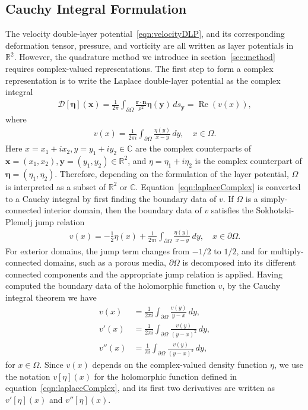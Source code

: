 \documentclass[3p]{elsarticle}
\newcommand{\Real}{\Re}
\newcommand{\bd}{{\partial}}
\newcommand{\CC}{{\mathbb{C}}}
\newcommand{\DD}{{\mathcal{D}}}
\newcommand{\eeta}{{\boldsymbol\eta}}
\newcommand{\nn}{{\mathbf{n}}}
\newcommand{\rr}{{\mathbf{r}}}
\renewcommand{\Re}{{\operatorname{Re}}}
\newcommand{\RR}{{\mathbb{R}}}
\newcommand{\xx}{{\mathbf{x}}}
\newcommand{\yy}{{\mathbf{y}}}
\begin{document}
\subsection{Cauchy Integral Formulation}
\label{sec:DLPcomplex}
The velocity double-layer potential~\eqref{eqn:velocityDLP}, and its
corresponding deformation tensor, pressure, and vorticity are all
written as layer potentials in $\RR^2$. However, the quadrature method
we introduce in section~\ref{sec:method} requires complex-valued
representations. The first step to form a complex representation is to
write the Laplace double-layer potential as the complex integral
\begin{align}
  \DD[\eeta](\xx) = \frac{1}{2\pi} \int_{\bd\Omega} 
    \frac{\rr \cdot \nn}{\rho^2}\eeta(\yy)\, ds_\yy = \Real (v(x)),
\end{align}
where
\begin{align}
  v(x) = \frac{1}{2\pi i} \int_{\bd\Omega}
    \frac{\eta(y)}{x - y} \, dy, \quad x \in \Omega.
  \label{eqn:laplaceComplex}
\end{align}
Here $x = x_1 + i x_2,y = y_1 + i y_2 \in \CC$ are the complex
counterparts of $\xx = (x_1,x_2),\yy = (y_1,y_2) \in \RR^2$, and $\eta =
\eta_1 + i \eta_2$ is the complex counterpart of $\eeta =
(\eta_1,\eta_2)$. Therefore, depending on the formulation of the layer
potential, $\Omega$ is interpreted as a subset of $\RR^2$ or $\CC$.
Equation~\eqref{eqn:laplaceComplex} is converted to a Cauchy integral by
first finding the boundary data of $v$. If $\Omega$ is a
simply-connected interior domain, then the boundary data of $v$
satisfies the Sokhotski-Plemelj jump relation
\begin{align}
  \label{eqn:SPrelation}
  v(x) = - \frac{1}{2} \eta(x) + \frac{1}{2\pi i} \int_{\bd\Omega}
    \frac{\eta(y)}{x-y}\, dy, \quad x \in \bd\Omega.
\end{align}
For exterior domains, the jump term changes from $-1/2$ to $1/2$, and
for multiply-connected domains, such as a porous media, $\bd\Omega$ is
decomposed into its different connected components and the appropriate
jump relation is applied.  Having computed the boundary data of the
holomorphic function $v$, by the Cauchy integral theorem we have
\begin{subequations}
  \label{eqn:cauchy}
  \begin{alignat}{3}
  v(x) &= \frac{1}{2\pi i}\int_{\bd\Omega} 
    \frac{v(y)}{y-x} \,dy, \\
  v'(x) &= \frac{1}{2\pi i} \int_{\bd\Omega}
    \frac{v(y)}{(y-x)^2} \, dy, \\
  v''(x) &= \frac{1}{\pi i} \int_{\bd\Omega}
    \frac{v(y)}{(y-x)^3} \, dy,
  \end{alignat}
\end{subequations}
for $x \in \Omega$.  Since $v(x)$ depends on the complex-valued density
function $\eta$, we use the notation $v[\eta](x)$ for the holomorphic
function defined in equation~\eqref{eqn:laplaceComplex}, and its first
two derivatives are written as $v'[\eta](x)$ and $v''[\eta](x)$.  
  
\end{document}
